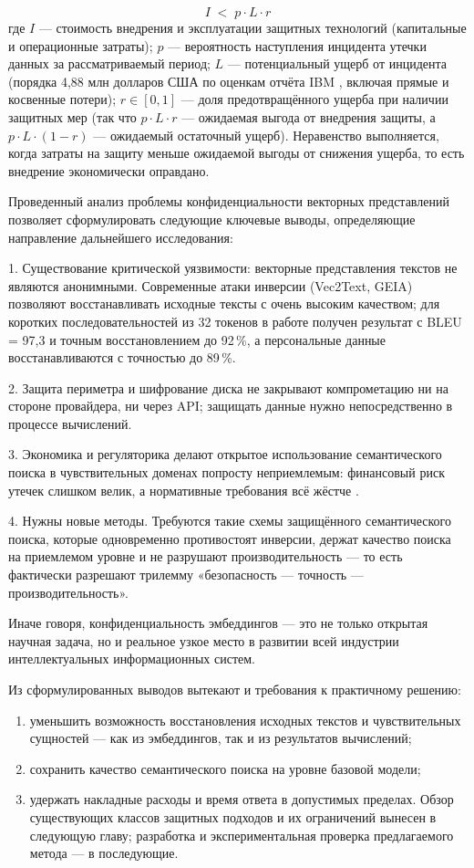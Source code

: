 \documentclass[a4paper, 12pt, oneside, openany]{article}
\begin{document}
\begin{equation}
	I \;<\; p \cdot L \cdot r
	\label{eq:1-10}
\end{equation}
где $I$ --- стоимость внедрения и эксплуатации защитных технологий (капитальные и операционные затраты); $p$ --- вероятность наступления инцидента утечки данных за рассматриваемый период; $L$ --- потенциальный ущерб от инцидента (порядка 4,88 млн долларов США по оценкам отчёта IBM \cite{ref9}, включая прямые и косвенные потери); $r \in [0, 1]$ --- доля предотвращённого ущерба при наличии защитных мер (так что $p\cdot L\cdot r$ --- ожидаемая выгода от внедрения защиты, а $p\cdot L\cdot (1-r)$ --- ожидаемый остаточный ущерб). Неравенство выполняется, когда затраты на защиту меньше ожидаемой выгоды от снижения ущерба, то есть внедрение экономически оправдано.

Проведенный анализ проблемы конфиденциальности векторных представлений позволяет сформулировать следующие ключевые выводы, определяющие направление дальнейшего исследования:

1. Существование критической уязвимости: векторные представления текстов не являются анонимными. Современные атаки инверсии (Vec2Text, GEIA) позволяют восстанавливать исходные тексты с очень высоким качеством; для коротких последовательностей из 32 токенов в работе \cite{ref5} получен результат с BLEU = 97{,}3 и точным восстановлением до 92\,\%, а персональные данные восстанавливаются с точностью до 89\,\%.

2. Защита периметра и шифрование диска не закрывают компрометацию ни на стороне провайдера, ни через API; защищать данные нужно непосредственно в процессе вычислений.

3. Экономика и регуляторика делают открытое использование семантического поиска в чувствительных доменах попросту неприемлемым: финансовый риск утечек слишком велик, а нормативные требования всё жёстче \cite{ref9}.

4. Нужны новые методы. Требуются такие схемы защищённого семантического поиска, которые одновременно противостоят инверсии, держат качество поиска на приемлемом уровне и не разрушают производительность — то есть фактически разрешают трилемму «безопасность — точность — производительность».

Иначе говоря, конфиденциальность эмбеддингов — это не только открытая научная задача, но и реальное узкое место в развитии всей индустрии интеллектуальных информационных систем.

Из сформулированных выводов вытекают и требования к практичному решению:
\begin{enumerate}
	\def\labelenumi{\arabic{enumi}.}
	\item
	уменьшить возможность восстановления исходных текстов и чувствительных сущностей — как из эмбеддингов, так и из результатов вычислений;
	\item
	сохранить качество семантического поиска на уровне базовой модели;
	\item
	удержать накладные расходы и время ответа в допустимых пределах. Обзор существующих классов защитных подходов и их ограничений вынесен в следующую главу; разработка и экспериментальная проверка предлагаемого метода — в последующие.
\end{enumerate}
\end{document}
